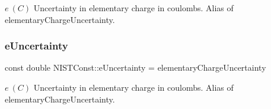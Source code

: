 $e \ (C)$ Uncertainty in elementary charge in coulombs. Alias of elementary\+Charge\+Uncertainty. \mbox{\label{group___elementary_charge_ga2c92e71a42a5f0e7facd87c2c15c0f2b}} 
\subsubsection{\texorpdfstring{e\+Uncertainty}{eUncertainty}}
{\footnotesize\ttfamily const double N\+I\+S\+T\+Const\+::e\+Uncertainty = elementary\+Charge\+Uncertainty}

$e \ (C)$ Uncertainty in elementary charge in coulombs. Alias of elementary\+Charge\+Uncertainty. 
